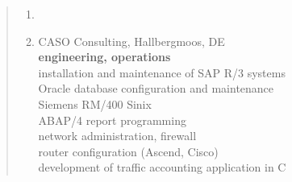 \documentclass[a4paper]{report}
\begin{document}
\begin{quote}
\begin{enumerate}
\item[ ]

\item[1999]         CASO Consulting, Hallbergmoos, DE\\
                    \textbf{engineering, operations}\\
                    installation and maintenance of SAP R/3 systems\\
                    Oracle database configuration and maintenance\\
                    Siemens RM/400 Sinix\\
                    ABAP/4 report programming\\
                    network administration, firewall\\
                    router configuration (Ascend, Cisco)\\
                    development of traffic accounting application in C

\end{enumerate}
\end{quote}
\end{document}
